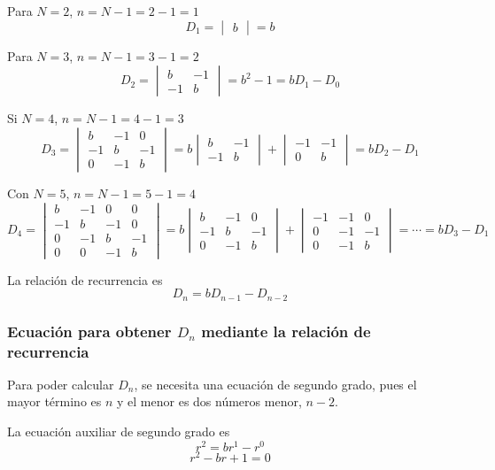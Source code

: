 Para $N=2$, $n=N-1=2-1=1$
\[
  D_1 = \begin{vmatrix}b\end{vmatrix} = b
\]

Para $N=3$, $n=N-1 = 3-1 = 2$
\[
  D_2
  =
  \begin{vmatrix}b & -1\\ -1 & b\end{vmatrix}
  = b^2 -1 = b D_1 - D_0
\]

Si $N=4$, $n=N-1 = 4-1 = 3$
\[
  D_3
  =
  \begin{vmatrix}b & -1 & 0\\ -1 & b & -1\\ 0 & -1 & b\end{vmatrix}
  = b\begin{vmatrix}b & -1\\ -1 & b\end{vmatrix}
  + \begin{vmatrix}-1 & -1\\ 0 & b\end{vmatrix}
  = b D_2 - D_1
\]

Con $N=5$, $n=N-1 = 5-1 = 4$
\[
  D_4
  =
  \begin{vmatrix}
    b & -1 & 0 & 0\\ -1 & b & -1 & 0\\ 0 & -1 & b & -1\\0&0&-1&b
  \end{vmatrix}
  = b\begin{vmatrix}b & -1&0\\ -1 & b&-1\\0&-1&b\end{vmatrix}
  + \begin{vmatrix}-1 & -1 & 0\\ 0 & -1 & -1\\0 & -1 & b\end{vmatrix}
  = \cdots = b D_3 - D_1
\]

La relación de recurrencia es
\[
  D_n = b D_{n-1} - D_{n-2}
\]

\subsubsection{Ecuación para obtener $D_n$ mediante la relación de
  recurrencia}
Para poder calcular $D_n$, se necesita una ecuación de segundo grado,
pues el mayor término es $n$ y el menor es dos números menor, $n-2$.

La ecuación auxiliar de segundo grado es
\[
  r^2 = br^1-r^0
\]
\[
  r^2-br+1 = 0
\]

